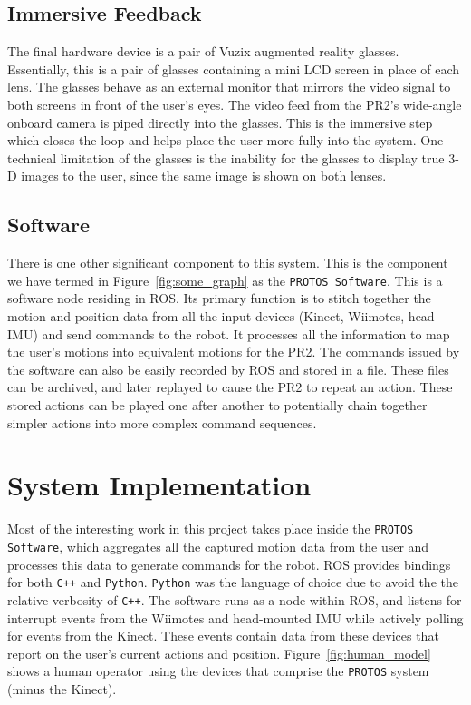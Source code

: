 \documentclass{sig-alternate}
\begin{document}
\subsection{Immersive Feedback}
\label{sec:model_feedback}
The final hardware device is a pair of Vuzix augmented reality glasses.
Essentially, this is a pair of glasses containing a mini LCD screen in place of
each lens. The glasses behave as
an external monitor that mirrors the video signal to both screens in front
of the user's eyes. 
The video feed from the PR2's wide-angle onboard camera is piped
directly into the glasses. This is the immersive step which closes the loop and
helps place the user more fully into the system. One technical limitation of the glasses is
the inability for the glasses to display true 3-D images to the user, since the same image is
shown on both lenses.

\subsection{Software}
\label{sec:model_software}
There is one other significant component to this system. This is the
component we have
termed in Figure~\ref{fig:some_graph} as the {\tt PROTOS Software}. This is a 
software node residing in ROS. Its primary function is to stitch together the
motion and position data from all the input devices (Kinect, Wiimotes, head 
IMU) and send commands to the robot. It processes all the information to map the user's motions
into equivalent motions for the PR2. The commands issued by the software can also be easily recorded by 
ROS and stored in a file. These files can be archived, and later replayed to cause the PR2 to repeat an action.
These stored actions can be played one after another to potentially chain together simpler actions into
more complex command sequences.

\section{System Implementation}
\label{sec:system_implementation}
Most of the interesting work in this project takes place inside the
{\tt PROTOS Software}, which aggregates all the captured motion data from the
user and processes this data to generate commands for the robot. ROS provides
bindings for both {\tt C++} and {\tt Python}. {\tt Python} was the language of choice due to avoid
the the relative verbosity of {\tt C++}.
The software runs as a node within ROS, and listens for interrupt events from the Wiimotes and head-mounted
IMU while actively polling for events from the Kinect. These events contain data
from these devices that report on the user's current actions and position. Figure~\ref{fig:human_model} shows
a human operator using the devices that comprise the {\tt PROTOS} system (minus the Kinect).
\end{document}
